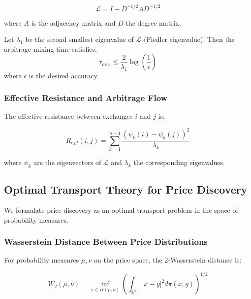 \documentclass[12pt]{article}
\begin{document}
\begin{equation}
\mathcal{L} = I - D^{-1/2} A D^{-1/2}
\end{equation}

where $A$ is the adjacency matrix and $D$ the degree matrix.

\begin{theorem}
Let $\lambda_1$ be the second smallest eigenvalue of $\mathcal{L}$ (Fiedler eigenvalue). Then the arbitrage mixing time satisfies:
\begin{equation}
\tau_{mix} \leq \frac{2}{\lambda_1} \log\left(\frac{1}{\epsilon}\right)
\end{equation}
where $\epsilon$ is the desired accuracy.
\end{theorem}

\subsubsection{Effective Resistance and Arbitrage Flow}

The effective resistance between exchanges $i$ and $j$ is:

\begin{equation}
R_{eff}(i,j) = \sum_{k=1}^{n-1} \frac{(\psi_k(i) - \psi_k(j))^2}{\lambda_k}
\end{equation}

where $\psi_k$ are the eigenvectors of $\mathcal{L}$ and $\lambda_k$ the corresponding eigenvalues.

\subsection{Optimal Transport Theory for Price Discovery}

We formulate price discovery as an optimal transport problem in the space of probability measures.

\subsubsection{Wasserstein Distance Between Price Distributions}

For probability measures $\mu, \nu$ on the price space, the 2-Wasserstein distance is:

\begin{equation}
W_2(\mu, \nu) = \inf_{\pi \in \Pi(\mu,\nu)} \left(\int_{\mathbb{R}^2} |x-y|^2 d\pi(x,y)\right)^{1/2}
\end{equation}
\end{document}

